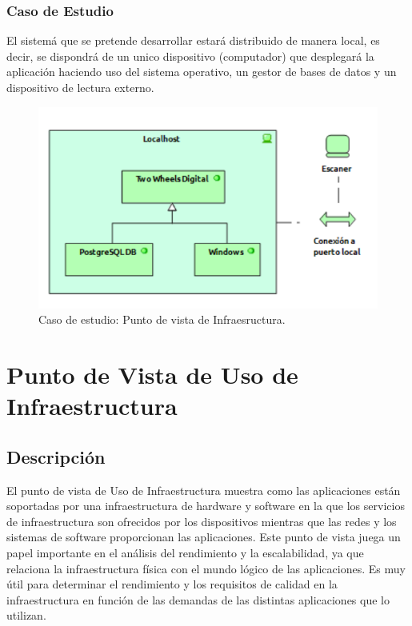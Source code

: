 \subsubsection{Caso de Estudio}
El sistemá que se pretende desarrollar estará distribuido de manera local, es decir, se dispondrá de un unico dispositivo (computador) que desplegará la aplicación haciendo uso del sistema operativo, un gestor de bases de datos y un dispositivo de lectura externo.


\begin{figure}[h]
	\centering
	\includegraphics[width=1.0\textwidth]{imagenes/Caso_Estudio/Tecnologia/infraestructura.PDF}
	\caption{Caso de estudio: Punto de vista de Infraesructura.}
	\label{fig:gap_analysis}
\end{figure}

\section{Punto de Vista de Uso de Infraestructura}
\subsection{Descripción}
El punto de vista de Uso de Infraestructura muestra como las aplicaciones están soportadas por una infraestructura de hardware y software en la que los servicios de infraestructura  son ofrecidos por los dispositivos mientras que las  redes y los sistemas de software proporcionan las aplicaciones. Este punto de vista juega un papel importante en el análisis del rendimiento y la escalabilidad, ya que relaciona la infraestructura física con el mundo lógico de las aplicaciones. Es muy útil para determinar el rendimiento y los requisitos de calidad en la infraestructura en función de las demandas de las distintas aplicaciones que lo utilizan.

